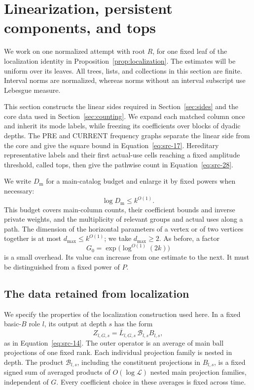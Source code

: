 \section{Linearization, persistent components, and tops}
\label{sec:linearization}

We work on one normalized attempt with root \(R\), for one fixed leaf of
the localization identity in Proposition~\ref{prop:localization}.
The estimates will be uniform over its leaves.  All trees, lists, and
collections in this section are finite.  Interval norms are normalized,
whereas norms without an interval subscript use Lebesgue measure.

This section constructs the linear sides required in
Section~\ref{sec:sides} and the core data used in
Section~\ref{sec:counting}.  We expand each matched column once and
inherit its mode labels, while freezing its coefficients over blocks
of dyadic depths.  The PRE and CURRENT frequency graphs separate
the linear side from the core and give the square bound in
Equation~\eqref{eq:src-17}.  Hereditary representative labels and their first
actual-use cells reaching a fixed amplitude threshold, called tops,
then give the pathwise count in Equation~\eqref{eq:src-28}.

We write \(D_{\mathrm m}\) for a main-catalog budget and enlarge it by fixed
powers when necessary:
\[
 \log D_{\mathrm m}\le k^{O(1)}.
\]
This budget covers main-column counts, their coefficient bounds and
inverse private weights, and the multiplicity of relevant groups and
actual uses along a path.  The dimension of the horizontal parameters
of a vertex or of two vertices together is at most
\(d_{\max}\le k^{O(1)}\); we take \(d_{\max}\ge2\).
As before, a factor
\[
 G_0=\exp\bigl(\log^{O(1)}(2k)\bigr)
\]
is a small overhead.  Its value can increase from one estimate to the
next.  It must be distinguished from a fixed power of \(P\).

\subsection{The data retained from localization}
\label{subsec:linearization-data}

We specify the properties of the localization construction used here.
In a fixed basic-\(B\) role \(l\), its output at depth \(s\) has the form
\[
 Z_{l,G,s}=\overline L_{l,G,s}\,\mathcal B_{l,s}B_{l,s},
\]
as in Equation~\eqref{eq:src-14}.  The outer operator is an average of
main ball projections of one fixed rank.  Each individual projection
family is nested in depth.  The product \(\mathcal B_{l,s}\), including
the constituent projections in \(B_{l,s}\), is a fixed signed sum of
averaged products of \(O(\log\mathcal L)\) nested main projection
families, independent of \(G\).  Every coefficient choice in these
averages is fixed across time.

